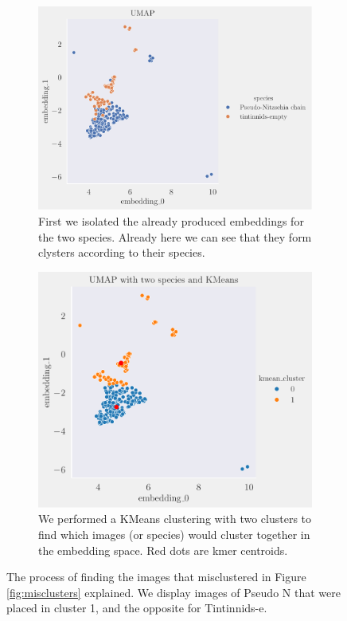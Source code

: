 \begin{figure}[H]
    \centering
    \begin{subfigure}[b]{1\linewidth}
        \includegraphics[width=\linewidth]{examples/tests_eb/figs/umap_on_two_species.pdf}
        \caption{First we isolated the already produced embeddings for the two species. Already here we can see that they form clysters according to their species.}
        \label{misclust1}
    \end{subfigure}
    
    \vspace{1em}
    
    \begin{subfigure}[b]{1\linewidth}
        \includegraphics[width=\linewidth]{examples/tests_eb/figs/kmeans_cluster_umap_on_two_species.pdf}
        \caption{We performed a KMeans clustering with two clusters to find which images (or species) would cluster together in the embedding space. Red dots are kmer centroids.}
        \label{misclust2}
    \end{subfigure}
    \caption{The process of finding the images that misclustered in Figure \ref{fig:misclusters} explained. We display images of Pseudo N that were placed in cluster 1, and the opposite for Tintinnids-e.}
    \label{fig:misclustering_process}
\end{figure}

